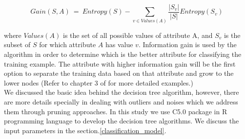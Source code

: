 \begin{equation}
Gain(S,A)\ =\ Entropy(S) - \sum_{v \in Values(A) } \frac{|S_v|}{|S|} Entropy(S_v)
\end{equation} 

where $Values(A)$ is the set of all possible values of attribute A, and $S_v$ is the subset of $S$ for which attribute $A$ has value $v$. Information gain is used by the algorithm in order to determine which is the better attribute for classifying the training example. The attribute with higher information gain will be the first option to separate the training data based on that attribute and grow to the lower nodes (Refer to chapter 3 of \citet{Mitchell_1997_Book} for more detailed examples.) \\
We discussed the basic idea behind the decision tree algorithm, however, there are more details specially in dealing with outliers and noises which we address them through pruning approaches. In this study we use C5.0 package \citep{C50_2015} in R programming language \citep{R_2016_program} to develop the decision tree algorithms. We discuss the input parameters in the section.\ref{classification_model}.  